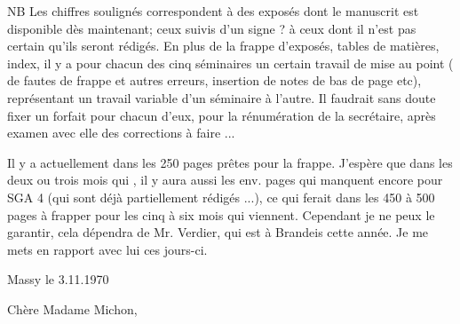 
NB Les chiffres soulignés correspondent à des exposés dont le manuscrit est disponible dès maintenant; ceux suivis d'un signe ? à ceux dont il n'est pas certain qu'ils seront rédigés. En plus de la frappe d'exposés, tables de matières, index, il y a pour chacun des cinq séminaires  un certain travail de mise au point ( de fautes de frappe et autres erreurs, insertion de notes de bas de page etc), représentant un travail variable d'un séminaire à l'autre. Il faudrait sans doute fixer un forfait pour chacun d'eux, pour la rénumération de la secrétaire, après examen avec elle des corrections à faire ...

Il y a actuellement dans les 250 pages prêtes pour la frappe. J'espère que dans les deux ou trois mois qui , il y aura aussi les env.  pages qui manquent encore pour SGA 4 (qui sont déjà partiellement rédigés ...), ce qui ferait dans les 450 à 500 pages à frapper pour les cinq à six mois qui viennent. Cependant je ne peux le garantir, cela dépendra de Mr. Verdier, qui est à Brandeis cette année. Je me mets en rapport avec lui ces jours-ci.

\begin{flushright}
Massy le 3.11.1970\\
\end{flushright}
Chère Madame Michon,\\

